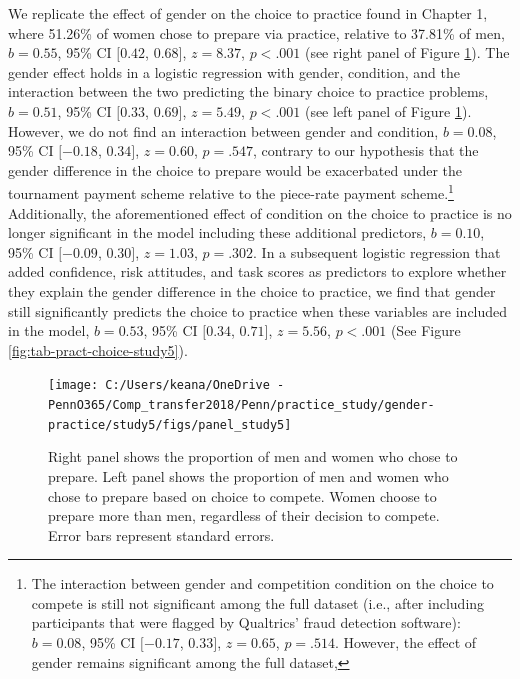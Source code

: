 \documentclass[a4paper, nobind]{templates/ociamthesis}
\begin{document}
We replicate the effect of gender on the choice to practice found in Chapter 1, where 51.26\% of women chose to prepare via practice, relative to 37.81\% of men, \(b = 0.55\), 95\% CI \([0.42\), \(0.68]\), \(z = 8.37\), \(p < .001\) (see right panel of Figure \ref{fig:panel-study5}). The gender effect holds in a logistic regression with gender, condition, and the interaction between the two predicting the binary choice to practice problems, \(b = 0.51\), 95\% CI \([0.33\), \(0.69]\), \(z = 5.49\), \(p < .001\) (see left panel of Figure \ref{fig:panel-study5}). However, we do not find an interaction between gender and condition, \(b = 0.08\), 95\% CI \([-0.18\), \(0.34]\), \(z = 0.60\), \(p = .547\), contrary to our hypothesis that the gender difference in the choice to prepare would be exacerbated under the tournament payment scheme relative to the piece-rate payment scheme.\footnote{The interaction between gender and competition condition on the choice to compete is still not significant among the full dataset (i.e., after including participants that were flagged by Qualtrics' fraud detection software): \(b = 0.08\), 95\% CI \([-0.17\), \(0.33]\), \(z = 0.65\), \(p = .514\). However, the effect of gender remains significant among the full dataset,} Additionally, the aforementioned effect of condition on the choice to practice is no longer significant in the model including these additional predictors, \(b = 0.10\), 95\% CI \([-0.09\), \(0.30]\), \(z = 1.03\), \(p = .302\). In a subsequent logistic regression that added confidence, risk attitudes, and task scores as predictors to explore whether they explain the gender difference in the choice to practice, we find that gender still significantly predicts the choice to practice when these variables are included in the model, \(b = 0.53\), 95\% CI \([0.34\), \(0.71]\), \(z = 5.56\), \(p < .001\) (See Figure \ref{fig:tab-pract-choice-study5}).

\begin{figure}

{\centering \texttt{[image: C:/Users/keana/OneDrive - PennO365/Comp\_transfer2018/Penn/practice\_study/gender-practice/study5/figs/panel\_study5]} 

}

\caption{Right panel shows the proportion of men and women who chose to prepare. Left panel shows the proportion of men and women who chose to prepare based on choice to compete. Women choose to prepare more than men, regardless of their decision to compete. Error bars represent standard errors.}\label{fig:panel-study5}
\end{figure}
\end{document}
